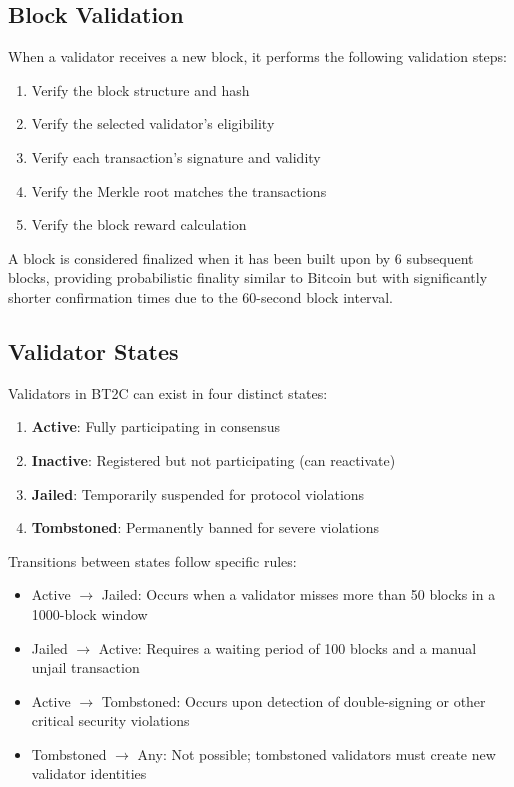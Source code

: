 \documentclass[10pt,a4paper]{article}
\begin{document}
\subsection{Block Validation}
When a validator receives a new block, it performs the following validation steps:

\begin{enumerate}
\item Verify the block structure and hash
\item Verify the selected validator's eligibility
\item Verify each transaction's signature and validity
\item Verify the Merkle root matches the transactions
\item Verify the block reward calculation
\end{enumerate}

A block is considered finalized when it has been built upon by 6 subsequent blocks, providing probabilistic finality similar to Bitcoin but with significantly shorter confirmation times due to the 60-second block interval.

\subsection{Validator States}
Validators in BT2C can exist in four distinct states:

\begin{enumerate}
\item \textbf{Active}: Fully participating in consensus
\item \textbf{Inactive}: Registered but not participating (can reactivate)
\item \textbf{Jailed}: Temporarily suspended for protocol violations
\item \textbf{Tombstoned}: Permanently banned for severe violations
\end{enumerate}

Transitions between states follow specific rules:

\begin{itemize}
\item Active $\rightarrow$ Jailed: Occurs when a validator misses more than 50 blocks in a 1000-block window
\item Jailed $\rightarrow$ Active: Requires a waiting period of 100 blocks and a manual unjail transaction
\item Active $\rightarrow$ Tombstoned: Occurs upon detection of double-signing or other critical security violations
\item Tombstoned $\rightarrow$ Any: Not possible; tombstoned validators must create new validator identities
\end{itemize}
\end{document}
